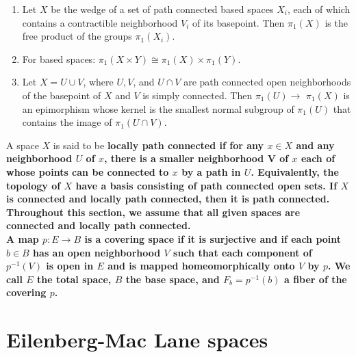 \begin{coro}
    \begin{enumerate}
        \item Let $X$ be the wedge of a set of path connected based spaces $X_i$, each of which contains a contractible neighborhood $V_i$ of its basepoint. Then $\pi_1(X)$ is the free product of the groups $\pi_1\left(X_i\right)$.
        \item For based spaces: $\pi_1(X \times Y) \cong \pi_1(X) \times \pi_1(Y)$.
        \item Let $X=U \cup V$, where $U, V$, and $U \cap V$ are path connected open neighborhoods of the basepoint of $X$ and $V$ is simply connected. Then $\pi_1(U) \longrightarrow$ $\pi_1(X)$ is an epimorphism whose kernel is the smallest normal subgroup of $\pi_1(U)$ that contains the image of $\pi_1(U \cap V)$.
    \end{enumerate}
\end{coro}

A space $X$ is said to be \bf{locally path connected} if for any $x \in X$ and any neighborhood $U$ of $x$, there is a smaller neighborhood V of $x$ each of whose points can be connected to $x$ by a path in $U$. Equivalently, the topology of $X$ have a basis consisting of path connected open sets. If $X$ is connected and locally path connected, then it is path connected. Throughout this section, we assume that all given spaces are connected and locally path connected.\\

A map $p: E \longrightarrow B$ is a covering space if it is surjective and if each point $b \in B$ has an open neighborhood $V$ such that each component of $p^{-1}(V)$ is open in $E$ and is mapped homeomorphically onto $V$ by $p$. We call $E$ the \bf{total space}, $B$ the \bf{base space}, and $F_b=p^{-1}(b)$ a \bf{fiber of the covering} $p$.






\section{Eilenberg-Mac Lane spaces}

